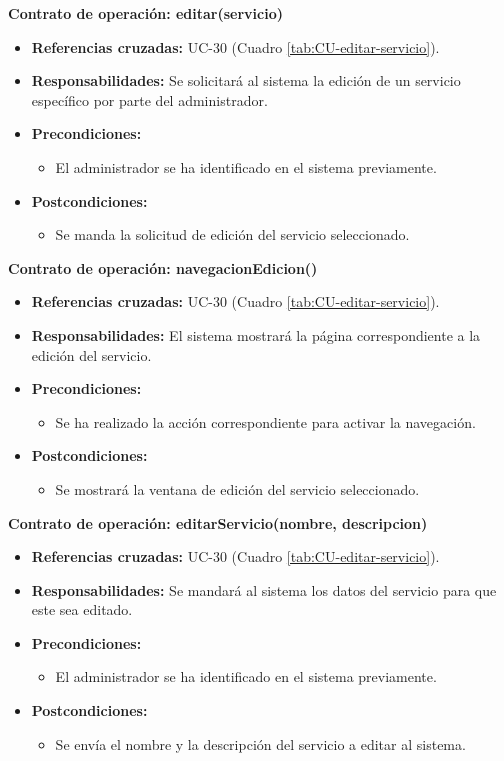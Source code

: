 \textbf{Contrato de operación: editar(servicio)}
\begin{itemize}
\item \textbf{Referencias cruzadas:} UC-30 (Cuadro \ref{tab:CU-editar-servicio}).
\item \textbf{Responsabilidades:} Se solicitará al sistema la edición de un servicio específico por parte del administrador.
\item \textbf{Precondiciones:} 
 \begin{itemize}
\item El administrador se ha identificado en el sistema previamente.
\end {itemize}
\item \textbf{Postcondiciones:} 
 \begin{itemize}
\item Se manda la solicitud de edición del servicio seleccionado.
\end {itemize}
\end {itemize}

\textbf{Contrato de operación: navegacionEdicion()}
\begin{itemize}
\item \textbf{Referencias cruzadas:} UC-30 (Cuadro \ref{tab:CU-editar-servicio}).
\item \textbf{Responsabilidades:} El sistema mostrará la página correspondiente a la edición del servicio.
\item \textbf{Precondiciones:} 
 \begin{itemize}
\item Se ha realizado la acción correspondiente para activar la navegación.
\end {itemize}
\item \textbf{Postcondiciones:} 
 \begin{itemize}
\item Se mostrará la ventana de edición del servicio seleccionado.
\end {itemize}
\end {itemize}

\textbf{Contrato de operación: editarServicio(nombre, descripcion)}
\begin{itemize}
\item \textbf{Referencias cruzadas:} UC-30 (Cuadro \ref{tab:CU-editar-servicio}).
\item \textbf{Responsabilidades:} Se mandará al sistema los datos del servicio para que este sea editado.
\item \textbf{Precondiciones:} 
 \begin{itemize}
\item El administrador se ha identificado en el sistema previamente.
\end {itemize}
\item \textbf{Postcondiciones:} 
 \begin{itemize}
\item Se envía el nombre y la descripción del servicio a editar al sistema.
\end {itemize}
\end {itemize}

